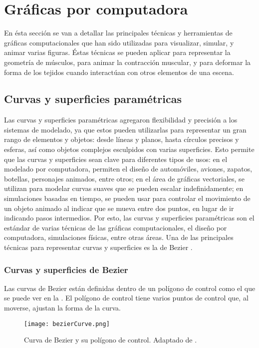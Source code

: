 \section{Gráficas por computadora}

En ésta sección se van a detallar las principales técnicas y herramientas de gráficas computacionales que han sido utilizadas para visualizar, simular, y animar varias figuras. Éstas técnicas se pueden aplicar para representar la geometría de músculos, para animar la contracción muscular, y para deformar la forma de los tejidos cuando interactúan con otros elementos de una escena. 

\subsection{Curvas y superficies paramétricas}

Las curvas y superficies paramétricas agregaron flexibilidad y precisión a los sistemas de modelado, ya que estos pueden utilizarlas para representar un gran rango de elementos y objetos: desde líneas y planos, hasta círculos precisos y esferas, así como objetos complejos esculpidos con varias superficies. Esto permite que las curvas y superficies sean clave para diferentes tipos de usos: en el modelado por computadora, permiten el diseño de automóviles, aviones, zapatos, botellas, personajes animados, entre otros; en el área de gráficas vectoriales, se utilizan para modelar curvas suaves que se pueden escalar indefinidamente; en simulaciones basadas en tiempo, se pueden usar para controlar el movimiento de un objeto animado al indicar que se mueva entre dos puntos, en lugar de ir indicando pasos intermedios. Por esto, las curvas y superficies paramétricas son el estándar de varias técnicas de las gráficas computacionales, el diseño por computadora, simulaciones físicas, entre otras áreas. Una de las principales técnicas para representar curvas y superficies es la de Bezier \citep{Rogers2001}. 

\subsubsection{Curvas y superficies de Bezier}

Las curvas de Bezier están definidas dentro de un polígono de control como el que se puede ver en la . El polígono de control tiene varios puntos de control que, al moverse, ajustan la forma de la curva. 

\begin{figure}[!ht]
	\centering
		\texttt{[image: bezierCurve.png]}
	\caption[Curva de Bezier.]{Curva de Bezier y su polígono de control. Adaptado de \citep{Rogers2001}.}
	\label{fig:bezierCurve}
\end{figure}

